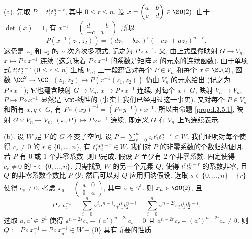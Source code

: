 \begin{solution}
(a). 先取 $P = t_1^rt_2^{n-r}$, 其中 $0 \leq r \leq n$. 设 $x = \begin{pmatrix} a & b \\ c & d \end{pmatrix} \in \SU(2)$. 由于 $\det(x) = 1$, 有 $x^{-1} = \begin{pmatrix} d & -b \\ -c & a \end{pmatrix}$. 所以
\[
P(x^{-1}(z_1, z_2)) = (dz_1 - bz_2)^r(-cz_1 + az_2)^{n-r}.
\]
这仍是 $z_1$ 和 $z_2$ 的 $n$ 次齐次多项式, 记之为 $P \circ x^{-1}$. 又, 由上式显然映射 $G \to V_n$, $x \longmapsto P \circ x^{-1}$ 连续 (这意味着 $P \circ x^{-1}$ 的系数是矩阵 $x$ 的元素的连续函数).
由于单项式 $t_1^rt_2^{n-r}$ ($0 \leq r \leq n$) 生成 $V_n$, 上一段蕴含对每个 $P \in V_n$ 和每个 $x \in \SU(2)$, 函数 $\CC^2 \to \CC$, $(z_1, z_2) \longmapsto P(x^{-1}(z_1, z_2))$ 仍由 $V_n$ 的元素给出 (记之为 $P \circ x^{-1}$); 它也蕴含映射 $G \to V_n$, $x \longmapsto P \circ x^{-1}$ 连续.
对每个 $x \in G$, 映射 $V_n \to V_n$, $P \longmapsto P \circ x^{-1}$ 显然是 $\CC$-线性的 (事实上我们已经用过这一事实). 又对每个 $P \in V_n$ 和所有 $x, y \in G$, 有 $P \circ (xy)^{-1} = (P \circ y^{-1}) \circ x^{-1}$. 所以由命题 \ref{prop:I.3.5.1}, 映射 $G \times V_n \to V_n$, $(x, P) \longmapsto P \circ x^{-1}$ 连续, 即定义 $G$ 在 $V_n$ 上的连续表示.

(b). 设 $W$ 是 $V$ 的 $G$-不变子空间. 设 $P = \sum_{r=0}^n c_rt_1^rt_2^{n-r} \in W$. 我们证明对每个使得 $c_r \neq 0$ 的 $r \in \{0, \ldots, n\}$, 有 $t_1^rt_2^{n-r} \in W$. 我们对 $P$ 的非零系数的个数归纳证明. 若 $P$ 有 $0$ 或 $1$ 个非零系数, 则已完成. 假设 $P$ 至少有 $2$ 个非零系数. 固定使得 $c_r \neq 0$ 的 $r \in \{0, \ldots, n\}$. 只需找到 $W$ 的另一个元素 $Q$, 使得 $t_1^rt_2^{n-r}$ 的系数非零, 且 $Q$ 的非零系数个数比 $P$ 少; 然后可以对 $Q$ 应用归纳假设. 选取 $s \in \{0, \ldots, n\} - \{r\}$ 使得 $c_s \neq 0$. 考虑 $x_a = \begin{pmatrix} a & 0 \\ 0 & a \end{pmatrix}$, 其中 $a \in S^1$. 则 $x_a \in \SU(2)$, 且
\[
P \circ x_a^{-1} = \sum_{i=0}^n a^ia^{n-i}c_it_1^it_2^{n-i} = \sum_{i=0}^n a^{n-2i}c_it_1^it_2^{n-i}.
\]
选取 $a, a' \in S^1$ 使得 $a^{n-2s}c_s - (a')^{n-2s}c_s = 0$ 且 $a^{n-2r}c_r - (a')^{n-2r}c_r \neq 0$. 则 $Q := P \circ x_a^{-1} - P \circ x_{a'}^{-1} \in W - \{0\}$ 具有所要的性质.


\end{solution}
